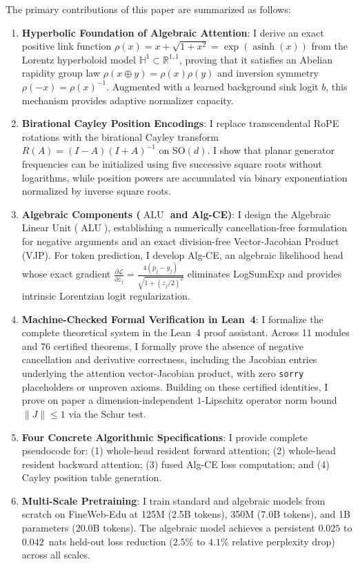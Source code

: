 \documentclass[11pt,a4paper]{article}
\theoremstyle{definition}
\newcommand{\SO}{\mathrm{SO}}
\begin{document}
The primary contributions of this paper are summarized as follows:
\begin{enumerate}
    \item \textbf{Hyperbolic Foundation of Algebraic Attention}: I derive an exact positive link function $\rho(x) = x + \sqrt{1+x^2} = \exp(\operatorname{asinh}(x))$ from the Lorentz hyperboloid model $\mathbb{H}^1 \subset \mathbb{R}^{1,1}$, proving that it satisfies an Abelian rapidity group law $\rho(x \oplus y) = \rho(x)\rho(y)$ and inversion symmetry $\rho(-x) = \rho(x)^{-1}$. Augmented with a learned background sink logit $b$, this mechanism provides adaptive normalizer capacity.
    \item \textbf{Birational Cayley Position Encodings}: I replace transcendental RoPE rotations with the birational Cayley transform $R(A) = (I-A)(I+A)^{-1}$ on $\SO(d)$. I show that planar generator frequencies can be initialized using five successive square roots without logarithms, while position powers are accumulated via binary exponentiation normalized by inverse square roots.
    \item \textbf{Algebraic Components ($\operatorname{ALU}$ and Alg-CE)}: I design the Algebraic Linear Unit ($\operatorname{ALU}$), establishing a numerically cancellation-free formulation for negative arguments and an exact division-free Vector-Jacobian Product (VJP). For token prediction, I develop Alg-CE, an algebraic likelihood head whose exact gradient $\frac{\partial \mathcal{L}}{\partial z_j} = \frac{4(p_j - y_j)}{\sqrt{1+(z_j/2)^2}}$ eliminates LogSumExp and provides intrinsic Lorentzian logit regularization.
    \item \textbf{Machine-Checked Formal Verification in Lean~4}: I formalize the complete theoretical system in the Lean~4 proof assistant. Across 11 modules and 76 certified theorems, I formally prove the absence of negative cancellation and derivative correctness, including the Jacobian entries underlying the attention vector-Jacobian product, with zero \texttt{sorry} placeholders or unproven axioms. Building on these certified identities, I prove on paper a dimension-independent $1$-Lipschitz operator norm bound $\|J\| \le 1$ via the Schur test.
    \item \textbf{Four Concrete Algorithmic Specifications}: I provide complete pseudocode for: (1) whole-head resident forward attention; (2) whole-head resident backward attention; (3) fused Alg-CE loss computation; and (4) Cayley position table generation.
    \item \textbf{Multi-Scale Pretraining}: I train standard and algebraic models from scratch on FineWeb-Edu at 125M (2.5B tokens), 350M (7.0B tokens), and 1B parameters (20.0B tokens). The algebraic model achieves a persistent $0.025$ to $0.042$~nats held-out loss reduction ($2.5\%$ to $4.1\%$ relative perplexity drop) across all scales.

\end{enumerate}
\end{document}
